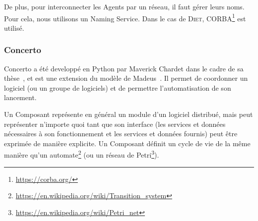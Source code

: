 \documentclass{article}
\newcommand{\diet}{\textsc{Diet}\xspace} %
\newcommand{\ns}{Naming Service\xspace}
\newcommand{\concerto}{Concerto\xspace}
\begin{document}
De plus, pour interconnecter les Agents par un réseau, il faut gérer leurs noms. Pour
cela, nous utilisons un \og \ns \fg. Dans le cas de \diet,
CORBA\footnote{\url{https://corba.org/}} est utilisé.

\subsubsection{\concerto}\label{concerto_section}
\concerto a été developpé en Python par Maverick Chardet dans le cadre de sa
thèse~\cite{papier_concerto}, et est une extension du modèle de
Madeus~\cite{papier_madeus}. Il permet de coordonner un logiciel (ou un groupe de
logiciels) et de permettre l'automatisation de son lancement.


Un \og Composant \fg représente en général un module d'un logiciel distribué,
mais peut représenter n'importe quoi tant que son interface (les services et
données nécessaires à son fonctionnement et les services et données fournis)
peut être exprimée de manière explicite. Un Composant définit un cycle de vie
de la même manière qu'un automate\footnote{
\url{https://en.wikipedia.org/wiki/Transition_system}} (ou un réseau de
Petri\footnote{\url{https://en.wikipedia.org/wiki/Petri_net}}).


\end{document}
